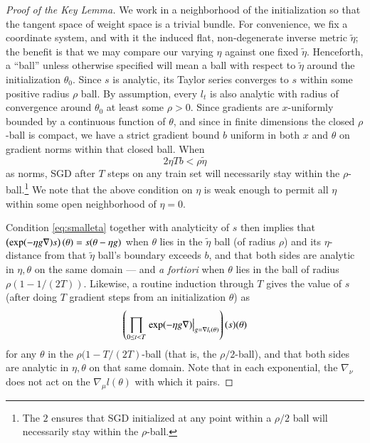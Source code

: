        \begin{proof}[Proof of the Key Lemma]%
            We work in a neighborhood of the initialization so that the tangent
            space of weight space is a trivial bundle.  For convenience, we fix
            a  coordinate system, and with it the induced flat,
            non-degenerate inverse metric $\tilde\eta$; the benefit is that we
            may compare our varying $\eta$ against one fixed $\tilde\eta$.
            Henceforth, a ``ball'' unless otherwise specified will mean a ball
            with respect to $\tilde\eta$ around the initialization $\theta_0$.
            Since $s$ is analytic, its Taylor series converges to $s$ within
            some positive radius $\rho$ ball.  By assumption, every $l_t$ is
            also analytic with radius of convergence around $\theta_0$ at least
            some $\rho>0$.  Since gradients are $x$-uniformly
            bounded by a continuous function of $\theta$, and since in finite
            dimensions the closed $\rho$-ball is compact, we have a strict
            gradient bound $b$ uniform in both $x$ and $\theta$ on gradient
            norms within that closed ball.  When
            \begin{equation} \label{eq:smalleta}
                2 \eta T b < \rho \tilde\eta
            \end{equation}
            as norms, SGD after $T$ steps on any train set
            will necessarily stay within the $\rho$-ball.\footnote{
                The $2$ ensures that SGD initialized at
                any point within a $\rho/2$ ball will necessarily stay within
                the $\rho$-ball.
            } We note that the above condition on $\eta$ is weak enough to
            permit all $\eta$ within some open neighborhood of $\eta=0$.  

            Condition \ref{eq:smalleta} together with analyticity of $s$ then
            implies that
            $
                \left(\exp(-\eta g \nabla) s\right)(\theta) = s(\theta - \eta g)
            $
            when $\theta$ lies in the $\tilde\eta$ ball (of radius $\rho$) and
            its $\eta$-distance from that $\tilde\eta$ ball's boundary exceeds
            $b$, and that both sides are analytic in $\eta, \theta$ on the same
            domain --- and \emph{a fortiori} when $\theta$ lies in the ball of
            radius $\rho (1 - 1/(2T))$.  Likewise, a routine induction through
            $T$ gives the value of $s$ (after doing $T$ gradient steps from an
            initialization $\theta$) as
            $$
                \left(
                    \prod_{0\leq t<T}
                        \left.
                            \exp(-\eta g \nabla)
                        \right|_{g=\nabla l_t(\theta)}
                \right)
                (s)(\theta)
            $$
            for any $\theta$ in the $\rho (1-T/(2T)$-ball (that is, the
            $\rho/2$-ball), and that both sides are analytic in $\eta, \theta$
            on that same domain.  Note that in each exponential, the
            $\nabla_\nu$ does not act on the $\nabla_\mu l(\theta)$ with which
            it pairs.  


\end{proof}
